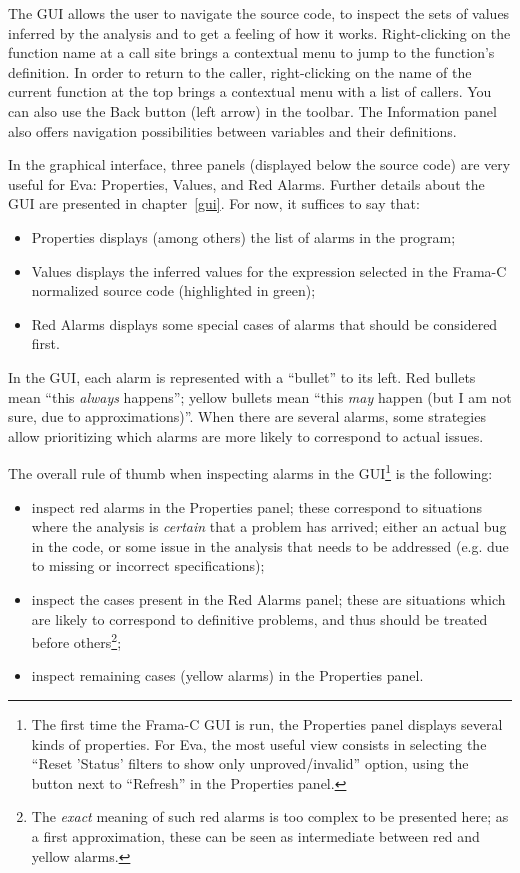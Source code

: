 \documentclass[web]{frama-c-book}
\newcommand{\Eva}{\textsf{Eva}}
\begin{document}
The GUI allows the user to navigate the source code, to inspect the sets of
values inferred by the analysis and to get
a feeling of how it works. Right-clicking on the function name
at a call site brings a contextual menu to jump
to the function's definition.
In order to return to the caller,
right-clicking on the name of the current function at the top
brings a contextual menu with a list of callers.
You can also use the Back button (left arrow) in the toolbar.
The Information panel also offers navigation possibilities between
variables and their definitions.

In the graphical interface, three panels (displayed below the
source code) are very useful for \Eva{}: Properties, Values, and
Red Alarms. Further details about the GUI are presented in chapter~\ref{gui}.
For now, it suffices to say that:

\begin{itemize}
\item Properties displays (among others) the list of alarms in the program;
\item Values displays the inferred values for the expression selected in the
  Frama-C normalized source code (highlighted in green);
\item Red Alarms displays some special cases of alarms that should be considered
  first.
\end{itemize}

In the GUI, each alarm is represented with a ``bullet'' to its left.
Red bullets mean ``this {\em always} happens''; yellow
bullets mean ``this {\em may} happen (but I am not sure, due to
approximations)''. When there are several alarms, some strategies allow
prioritizing which alarms are more likely to correspond to actual issues.

The overall rule of thumb when inspecting alarms in the GUI\footnote{The first
  time the Frama-C GUI is run, the Properties panel displays several kinds of
  properties. For \Eva{}, the most useful view consists in selecting the
  ``Reset 'Status' filters to show only unproved/invalid'' option, using the
  button next to ``Refresh'' in the Properties panel.} is the following:

\begin{itemize}
\item inspect red alarms in the Properties panel; these correspond to
  situations where the analysis is {\em certain} that a problem has arrived;
  either an actual bug in the code, or some issue in the analysis that needs to
  be addressed (e.g. due to missing or incorrect specifications);
\item inspect the cases present in the Red Alarms panel; these are situations
  which are likely to correspond to definitive problems, and thus should be
  treated before others\footnote{The {\em exact} meaning of such red alarms is
    too complex to be presented here; as a first approximation, these can be
    seen as intermediate between red and yellow alarms.};
\item inspect remaining cases (yellow alarms) in the Properties panel.
\end{itemize}
\end{document}
